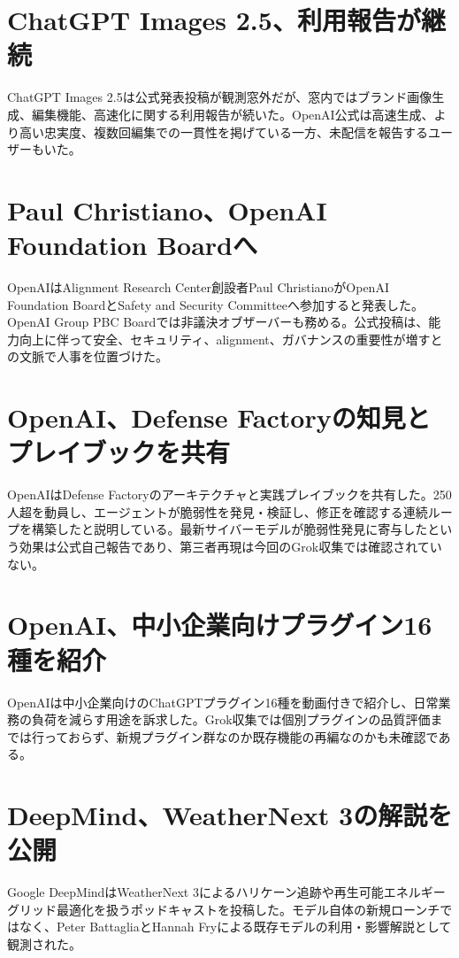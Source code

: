 \section{ChatGPT Images 2.5、利用報告が継続}
ChatGPT Images 2.5は公式発表投稿が観測窓外だが、窓内ではブランド画像生成、編集機能、高速化に関する利用報告が続いた。OpenAI公式は高速生成、より高い忠実度、複数回編集での一貫性を掲げている一方、未配信を報告するユーザーもいた。

\section{Paul Christiano、OpenAI Foundation Boardへ}
OpenAIはAlignment Research Center創設者Paul ChristianoがOpenAI Foundation BoardとSafety and Security Committeeへ参加すると発表した。OpenAI Group PBC Boardでは非議決オブザーバーも務める。公式投稿は、能力向上に伴って安全、セキュリティ、alignment、ガバナンスの重要性が増すとの文脈で人事を位置づけた。

\section{OpenAI、Defense Factoryの知見とプレイブックを共有}
OpenAIはDefense Factoryのアーキテクチャと実践プレイブックを共有した。250人超を動員し、エージェントが脆弱性を発見・検証し、修正を確認する連続ループを構築したと説明している。最新サイバーモデルが脆弱性発見に寄与したという効果は公式自己報告であり、第三者再現は今回のGrok収集では確認されていない。

\section{OpenAI、中小企業向けプラグイン16種を紹介}
OpenAIは中小企業向けのChatGPTプラグイン16種を動画付きで紹介し、日常業務の負荷を減らす用途を訴求した。Grok収集では個別プラグインの品質評価までは行っておらず、新規プラグイン群なのか既存機能の再編なのかも未確認である。

\section{DeepMind、WeatherNext 3の解説を公開}
Google DeepMindはWeatherNext 3によるハリケーン追跡や再生可能エネルギーグリッド最適化を扱うポッドキャストを投稿した。モデル自体の新規ローンチではなく、Peter BattagliaとHannah Fryによる既存モデルの利用・影響解説として観測された。

